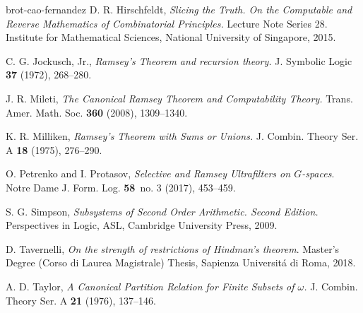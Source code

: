 \documentclass[11pt]{amsart}
\theoremstyle{definition}
\begin{document}
\begin{thebibliography}{brot-cao-fernandez}
D. R. Hirschfeldt,
{\em Slicing the Truth. On the Computable and Reverse Mathematics of Combinatorial Principles.}
Lecture Note Series 28.
Institute for Mathematical Sciences, National University of Singapore, 2015.

C. G. Jockusch, Jr.,
{\em Ramsey’s Theorem and recursion theory.}
J. Symbolic Logic
{\bf 37} (1972), 268--280.

J. R. Mileti,
{\em The Canonical Ramsey Theorem and Computability Theory.}
Trans. Amer. Math. Soc.
{\bf 360} (2008), 1309--1340.

K. R. Milliken,
{\em Ramsey's Theorem with Sums or Unions.}
J. Combin. Theory Ser. A
{\bf 18} (1975), 276--290.

O. Petrenko and I. Protasov,
{\it Selective and Ramsey Ultrafilters on $G$-spaces}.
Notre Dame J. Form. Log.
{\bf 58}~no. 3 (2017), 453--459.

S. G. Simpson,
{\em Subsystems of Second Order Arithmetic. Second Edition.}
Perspectives in Logic, ASL,
Cambridge University Press, 2009.

D. Tavernelli,
{\it On the strength of restrictions of Hindman's theorem}.
Master's Degree (Corso di Laurea Magistrale) Thesis,
Sapienza Universit\'a di Roma, 2018.

A. D. Taylor,
{\em A Canonical Partition Relation for Finite Subsets of $\omega$.}
J. Combin. Theory Ser. A
{\bf 21} (1976), 137--146.

\end{thebibliography}
\end{document}
